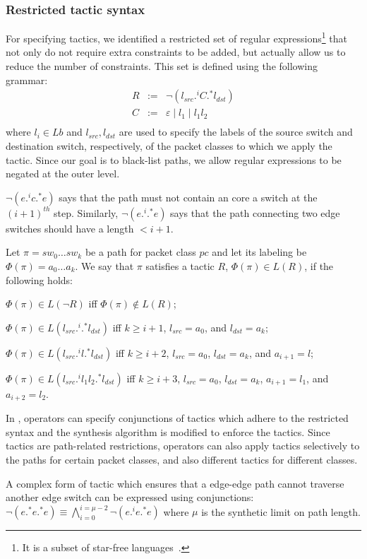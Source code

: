 \subsubsection{Restricted tactic syntax} 
For specifying tactics, we identified a restricted set of regular expressions\footnote{
	It is a subset of star-free languages~\cite{starfree}.}
 that not only do not require extra constraints to be added,
but actually allow us to reduce the number of constraints. 
This set is defined using the following grammar:
$$\begin{array}{rcl}
R  &  :=  &  \neg (l_{src} .^i C .^* l_{dst}) \\
C  &  :=  &  \varepsilon \mid l_1 \mid l_1 l_2\\
\end{array}$$
where $l_i\in Lb$ and $l_{src}, l_{dst}$ are used to specify the labels of the source switch 
and destination switch, respectively, of the packet classes to which we apply the tactic. 
Since our goal is to black-list paths, we allow regular expressions to be negated at the outer level. 
\begin{example}
 $\neg (e .^i c .^* e)$ says that the path must not contain an core a switch at the $(i+1)^{th}$ step. 
 Similarly, $\neg (e .^i .^* e)$ says that the path connecting two edge switches should have a length $ < i + 1$. 
\end{example}


Let $\pi = sw_0\ldots sw_k$ be a path for packet class $pc$
and let its labeling be $\Phi(\pi)= a_0\ldots a_k$.
We say that $\pi$ satisfies a tactic $R$,  $\Phi(\pi) \in L(R)$, if the following
holds:
\begin{compact2itemize}
\item $\Phi(\pi) \in L(\neg R)$ iff $\Phi(\pi) \not\in L(R)$;
\item $\Phi(\pi) \in L( l_{src} .^i .^* l_{dst})$ iff $k\geq i+1$, $l_{src}= a_0$, and $l_{dst}= a_k$; 
\item $\Phi(\pi)  \in L (l_{src} .^i l.^* l_{dst})$ iff $k\geq i+2$, $l_{src}= a_0$, $l_{dst}= a_k$, and $a_{i+1}=l$;
\item $\Phi(\pi)  \in L( l_{src} .^i l_1 l_2.^* l_{dst})$ iff $k\geq i+3$, $l_{src}= a_0$, $l_{dst}= a_k$, $a_{i+1}=l_1$, and $a_{i+2}=l_2$.
\end{compact2itemize}
In \Name, operators can specify conjunctions of tactics which adhere to the restricted 
syntax and the synthesis algorithm is modified to enforce the tactics. 
Since tactics are path-related restrictions, 
operators can also apply tactics selectively to the paths for certain packet classes, and also different tactics for different classes. 
\begin{example}
A complex form of tactic which ensures that a edge-edge path
cannot traverse another edge switch can be expressed using conjunctions:
$\neg (e .^* e .^* e)\equiv \bigwedge \limits_{i=0}^{i=\mu-2} \neg (e .^i e .^* e)$ where $\mu$ is the synthetic limit on path length. 
\end{example}


